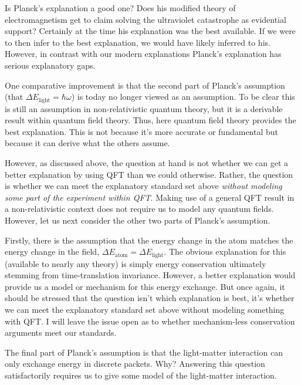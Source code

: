 \documentclass[prd,twocolumn,superscriptaddress,floatfix,amsmath,amssymb,amsfonts,nofootinbib]{revtex4-2}
\begin{document}
Is Planck's explanation a good one? Does his modified theory of electromagnetism get to claim solving the ultraviolet catastrophe as evidential support? Certainly at the time his explanation was the best available. If we were to then infer to the best explanation, we would have likely inferred to his. However, in contrast with our modern explanations Planck's explanation has serious explanatory gaps.

One comparative improvement is that the second part of Planck's assumption (that \mbox{$\Delta E_\text{light}=\hbar\omega$}) is today no longer viewed as an assumption. To be clear this is still an assumption in non-relativistic quantum theory, but it is a derivable result within quantum field theory. Thus, here quantum field theory provides the best explanation. This is not because it's more accurate or fundamental but because it can derive what the others assume. 

However, as discussed above, the question at hand is not whether we can get a better explanation by using QFT than we could otherwise. Rather, the question is whether we can meet the explanatory standard set above \textit{without modeling some part of the experiment within QFT}. Making use of a general QFT result in a non-relativistic context does not require us to model any quantum fields. However, let us next consider the other two parts of Planck's assumption.

Firstly, there is the assumption that the energy change in the atom matches the energy change in the field, $\Delta E_\text{atom}=\Delta E_\text{light}$. The obvious explanation for this (available to nearly any theory) is simply energy conservation ultimately stemming from time-translation invariance. However, a better explanation would provide us a model or mechanism for this energy exchange. But once again, it should be stressed that the question isn't which explanation is best, it's whether we can meet the explanatory standard set above without modeling something with QFT. I will leave the issue open as to whether mechanism-less conservation arguments meet our standards.

The final part of Planck's assumption is that the light-matter interaction can only exchange energy in discrete packets. Why? Answering this question satisfactorily requires us to give some model of the light-matter interaction.
\end{document}
